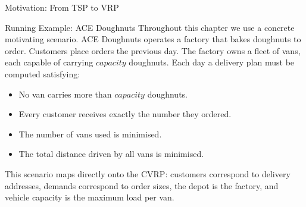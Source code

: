 \documentclass[aspectratio=169,10pt]{beamer}
\begin{document}
\begin{frame}[allowframebreaks]{Motivation: From TSP to VRP}
  \begin{block}{Running Example: ACE Doughnuts}
    Throughout this chapter we use a concrete motivating scenario.  ACE
    Doughnuts operates a factory that bakes doughnuts to order.  Customers
    place orders the previous day.  The factory owns a fleet of vans, each
    capable of carrying $capacity$ doughnuts.  Each day a delivery plan must
    be computed satisfying:
    \begin{itemize}
      \item No van carries more than $capacity$ doughnuts.
      \item Every customer receives exactly the number they ordered.
      \item The number of vans used is minimised.
      \item The total distance driven by all vans is minimised.
    \end{itemize}
  \end{block}

  This scenario maps directly onto the CVRP: customers correspond to delivery
  addresses, demands correspond to order sizes, the depot is the factory, and
  vehicle capacity is the maximum load per van.

\end{frame}
\end{document}
